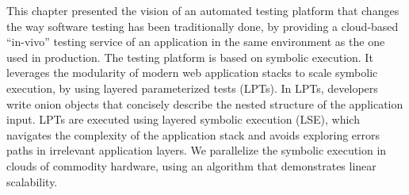 This chapter presented the vision of an automated testing platform that changes the way software testing has been traditionally done, by providing a cloud-based ``in-vivo'' testing service of an application in the same environment as the one used in production.
%
The testing platform is based on symbolic execution.  It leverages the modularity of modern web application stacks to scale symbolic execution, by using layered parameterized tests (LPTs).
%
In LPTs, developers write onion objects that concisely describe the nested structure of the application input.
%
LPTs are executed using layered symbolic execution (LSE), which navigates the complexity of the application stack and avoids exploring errors paths in irrelevant application layers.
%
We parallelize the symbolic execution in clouds of commodity hardware, using an algorithm that demonstrates linear scalability.


